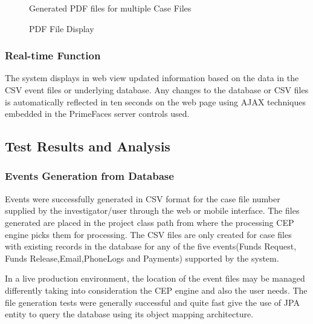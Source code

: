 \begin{center}
\begin{figure}[h]
\caption{Generated PDF files for multiple Case Files}

\end{figure}
\end{center}

\begin{center}
\begin{figure}[h]
\caption{PDF File Display}

\end{figure}
\end{center}

\subsubsection{Real-time Function}

\noindent The system displays in web view updated information based on the data in the CSV event files or underlying database. Any changes to the database or CSV files is automatically reflected in ten seconds on the web page using AJAX techniques embedded in the PrimeFaces server controls used.

\subsection{Test Results and Analysis}

\subsubsection{Events Generation from Database}

\noindent Events were successfully generated in CSV format for the case file number supplied by the investigator/user through the web or mobile interface. The files generated are placed in the project class path from where the processing CEP engine \cite{twentyfive} picks them for processing. The CSV files are only created for case files with existing records in the database for any of the five events(Funds Request, Funds Release,Email,PhoneLogs and Payments) supported by the system.

\noindent In a live production environment, the location of the event files may be managed differently taking into consideration the CEP engine \cite{twentyfive} and also the user needs. The file generation tests were  generally successful and quite fast give the use of JPA \cite{oracle}entity to query the database using its object mapping architecture.

